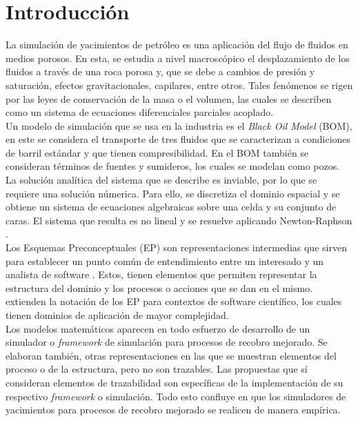 \chapter{Introducci\'{o}n}

La simulación de yacimientos de petróleo es una aplicación del flujo de fluidos en medios porosos. En esta, se estudia a nivel macroscópico el desplazamiento de los fluidos a través de una roca porosa y, que se debe a cambios de presión y saturación, efectos gravitacionales, capilares, entre otros. Tales fenómenos se rigen por las leyes de conservación de la masa o el volumen, las cuales se describen como un sistema de ecuaciones diferenciales parciales acoplado.\\

Un modelo de simulación que se usa en la industria es el \textit{Black Oil Model} (BOM), en este se considera el transporte de tres fluidos que se caracterizan a condiciones de barril estándar y que tienen compresibilidad. En el BOM también se consideran términos de fuentes y sumideros, los cuales se modelan como pozos. La solución analítica del sistema que se describe es inviable, por lo que se requiere una solución númerica. Para ello, se discretiza el dominio espacial y se obtiene un sistema de ecuaciones algebraicas sobre una celda y su conjunto de caras. El sistema que resulta es no lineal y se resuelve aplicando Newton-Raphson \citep{atkinson2008introduction}.\\

Los Esquemas Preconceptuales (EP) son representaciones intermedias que sirven para establecer un punto común de entendimiento entre un interesado y un analista de software \cite{zapata2007phd}. Estos, tienen elementos que permiten representar la estructura del dominio y los procesos o acciones que se dan en el mismo. \cite{norena2018det, JCalle} extienden la notación de los EP para contextos de software científico, los cuales tienen dominios de aplicación de mayor complejidad.\\

Los modelos matemáticos aparecen en todo esfuerzo de desarrollo de un simulador o \textit{framework} de simulación para procesos de recobro mejorado. Se elaboran también, otras representaciones en las que se muestran elementos del proceso o de la estructura, pero no son trazables. Las propuestas que sí consideran elementos de trazabilidad son específicas de la implementación de su respectivo \textit{framework} o simulación. Todo esto confluye en que los simuladores de yacimientos para procesos de recobro mejorado se realicen de manera empírica.\\

